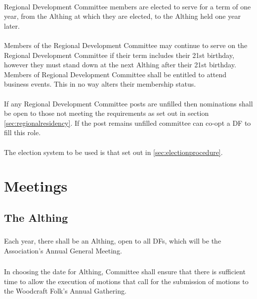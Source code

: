 \documentclass[a4paper, 12pt]{article}
\begin{document}
\paragraph{}
Regional Development Committee members are elected to serve for a term of one year, from the Althing at which they are elected, to the Althing held one year later.
\paragraph{}
Members of the Regional Development Committee may continue to serve on the Regional Development Committee if their term includes their 21st birthday, however they must stand down at the next Althing after their 21st birthday. Members of Regional Development Committee shall be entitled to attend business events. This in no way alters their membership status.
\paragraph{}
If any Regional Development Committee posts are unfilled then nominations shall be open to those not meeting the requirements as set out in section \ref{sec:regionalresidency}. If the post remains unfilled committee can co-opt a DF to fill this role.
\paragraph{}
The election system to be used is that set out in \ref{sec:electionprocedure}.

\section{Meetings}
\subsection{The Althing}
\subsubsection{}
Each year, there shall be an Althing, open to all DFs, which will be the  Association’s Annual General Meeting.
\subsubsection{}
In choosing the date for Althing, Committee shall ensure that there is sufficient time to allow the execution of motions that call for the submission of motions to the Woodcraft Folk’s Annual Gathering.
\end{document}
